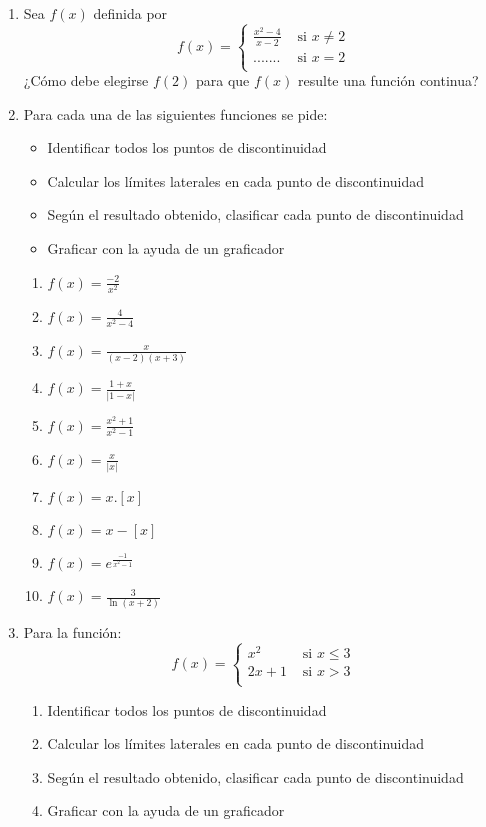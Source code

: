 \documentclass[12pt]{article}
\theoremstyle{definition}
\begin{document}
\begin{enumerate}
\item Sea $f(x)$ definida por
\begin{equation*}
f(x) =
\begin{cases} 
\frac{x^{2}-4}{x-2} & \text{  si   } x \neq 2 \\
  \text{.......} & \text{  si   } x =2 \\
\end{cases}
\end{equation*}
\noindent
¿Cómo debe elegirse $ f(2)$ para que $f(x)$  resulte una función continua?

\item  Para cada una de las siguientes funciones se pide: 
\begin{itemize}
\item Identificar todos los puntos de discontinuidad 
\item Calcular los límites laterales en cada punto de discontinuidad
\item Según el resultado obtenido, clasificar cada punto de discontinuidad
\item Graficar con la ayuda de un graficador
\end{itemize}

\begin{multicols}{2}
\begin{enumerate}
\item  $f(x) = \frac{-2}{x^{2}}$
\item $f(x) = \frac{4}{x^{2}-4}$
\item  $f(x) = \frac{x}{(x-2)(x+3)}$
\item  $f(x) = \frac{1+x}{|1-x|}$
\item  $f(x) = \frac{x^{2}+1}{x^{2}-1}$
\item  $f(x) = \frac{x}{|x|}$
\item $f(x) = x.[x]$
\item $f(x) = x-[x]$
\item $f(x) = e^{\frac{-1}{x^{2}-1}}$
\item $f(x) = \frac{3}{ \ln(x+2)}$
\end{enumerate}
\end{multicols}


\item  Para la función:
\begin{equation*}
f(x) =
\begin{cases} 
x^{2} & \text{  si   } x \leq 3 \\
2x+1 & \text{  si   } x >3 \\
\end{cases}
\end{equation*}
\begin{enumerate}
\item Identificar todos los puntos de discontinuidad 
\item Calcular los límites laterales en cada punto de discontinuidad
\item Según el resultado obtenido, clasificar cada punto de discontinuidad
\item Graficar con la ayuda de un graficador
\end{enumerate}


\end{enumerate}
\end{document}
